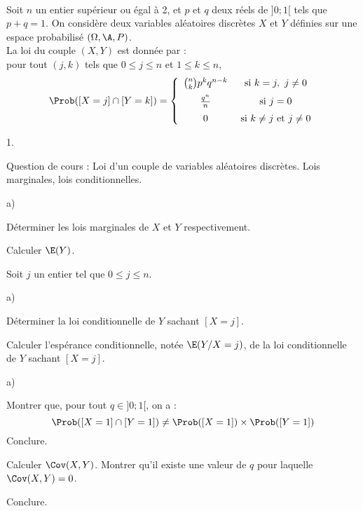 \documentclass[11pt]{article}%
\begin{document}
\begin{exerciceAP}~\\
  Soit $n$ un entier supérieur ou égal à 2, et $p$ et $q$ deux réels
  de $]0;1[$ tels que $p+q=1$. On considère deux variables aléatoires
  discrètes $X$ et $Y$ définies sur une espace probabilisé $(\Omega ,
  \A , P)$.\\
  La loi du couple $(X , Y)$ est donnée par : \\
  pour tout $(j,k)$ tels que $0 \leq j \leq n$ et $1 \leq k \leq n$,
  \[
  \Prob( [X=j] \cap [Y=k] ) = \left\{ 
    \begin{array}{cc} 
      \binom{n}{k} p^k q^{n-k} & \text{ si } k=j,\ j \neq 0 \\[.2cm] 
      \frac{q^n}{n} & \text{ si } j=0 \\[.2cm] 
      0 & \text{ si } k \neq j \text{ et } j \neq 0 
    \end{array} 
  \right.
  \]
  \begin{noliste}{1.}
    \setlength{\itemsep}{2mm}
  \item Question de cours : Loi d'un couple de variables aléatoires
    discrètes. Lois marginales, lois conditionnelles.
  \item 
    \begin{noliste}{a)}
    \setlength{\itemsep}{2mm} \item Déterminer les lois marginales de $X$ et
      $Y$ respectivement.
    \item Calculer $\E(Y)$.
    \end{noliste}
  \item Soit $j$ un entier tel que $0 \leq j \leq n$.
    \begin{noliste}{a)}
    \setlength{\itemsep}{2mm} \item Déterminer la loi conditionnelle de $Y$
      sachant $[X=j]$.
    \item Calculer l'espérance conditionnelle, notée $\E(Y \slash X =
      j)$, de la loi conditionnelle de $Y$ sachant $ [X=j]$.
    \end{noliste}
  \item
    \begin{noliste}{a)}
    \setlength{\itemsep}{2mm} \item Montrer que, pour tout $q \in ] 0 ; 1[$, on a :
      \[
      \Prob( [X=1] \cap [Y=1]) \neq \Prob([X=1]) \times \Prob( [Y=1] )
      \]
      Conclure.
    \item Calculer $\Cov (X,Y)$. Montrer qu'il existe une valeur de
      $q$ pour laquelle $\Cov (X,Y) = 0$.
    \item Conclure. \\
    \end{noliste} 
  \end{noliste}
\end{exerciceAP}
\end{document}
